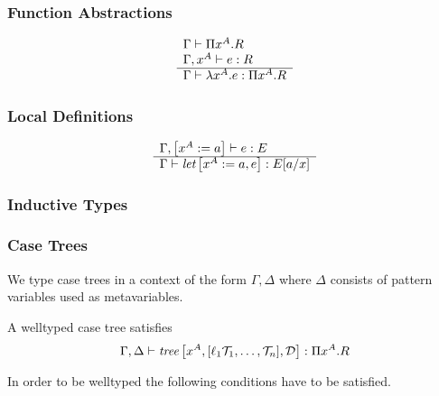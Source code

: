 \subsubsection{Function Abstractions}


$$
\begin{array}{l} 
    \Gamma \vdash \Pi x^A.R
    \\
    \Gamma, x^A \vdash e: R
 \\ \hline 
    \Gamma \vdash \lambda x^A. e : \Pi x^A. R
 \end{array}
$$







\subsubsection{Local Definitions}

$$
\begin{array}{l} 
    \Gamma, \left[ {x^A := a} \right] \vdash e : E
 \\ \hline 
    \Gamma \vdash {\text{\it let}} \left[ {x^A := a, e} \right] : E[a/x]
 \end{array}
$$





\subsubsection{Inductive Types}






\subsubsection{Case Trees}

We type case trees in a context of the form $\Gamma, \Delta$ where $\Delta$
consists of pattern variables used as metavariables.

A welltyped case tree satisfies
$$
    \Gamma, \Delta
    \vdash
    {{\text{\it tree}}\left[ {
        x^A,
        [\ell_1 {\mathcal T}_1, \ldots, {\mathcal T}_n],
        {\mathcal D}
    } \right]}
    : \Pi x^A. R
$$

In order to be welltyped the following conditions have to be satisfied.

